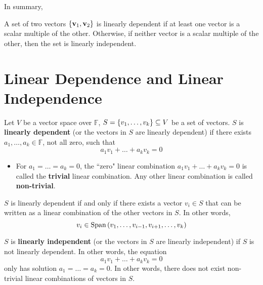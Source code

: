 \documentclass[letterpaper,12pt]{article}
\begin{document}
In summary,

\begin{theorem}
A set of two vectors $\left\{ \mathbf{v}_1, \mathbf{v}_2 \right\}$ is linearly dependent if at least one vector is a scalar multiple of the other. Otherwise, if neither vector is a scalar multiple of the other, then the set is linearly independent.
\end{theorem}

\section*{Linear Dependence and Linear Independence}
\begin{definition}
Let $V$ be a vector space over $\mathbb{F}$, $S = \left\{ v_1, \dots, v_k \right\} \subseteq V$ be a set of vectors. $S$ is \textbf{linearly dependent} (or the vectors in $S$ are linearly dependent) if there exists $a_1, \dots, a_k \in \mathbb{F}$, not all zero, such that
\begin{equation*}
    a_1 v_1 + \dots + a_k v_k = 0
\end{equation*}
\begin{itemize}
    \item For $a_1 = \dots = a_k = 0$, the ``zero" linear combination $a_1 v_1 + \dots + a_k v_k = 0$ is called the \textbf{trivial} linear combination. Any other linear combination is called \textbf{non-trivial}.
\end{itemize}
\end{definition}

\begin{theorem}
$S$ is linearly dependent if and only if there exists a vector $v_i \in S$ that can be written as a linear combination of the other vectors in $S$. In other words,
\begin{equation*}
    v_i \in \text{Span}\left(v_1, \dots, v_{i-1}, v_{i+1}, \dots, v_k \right)
\end{equation*}
\end{theorem}

\begin{definition}
$S$ is \textbf{linearly independent} (or the vectors in $S$ are linearly independent) if $S$ is not linearly dependent. In other words, the equation
\begin{equation*}
    a_1 v_1 + \dots + a_k v_k = 0
\end{equation*}
only has solution $a_1 = \dots = a_k = 0$. In other words, there does not exist non-trivial linear combinations of vectors in $S$.
\end{definition}
\end{document}
